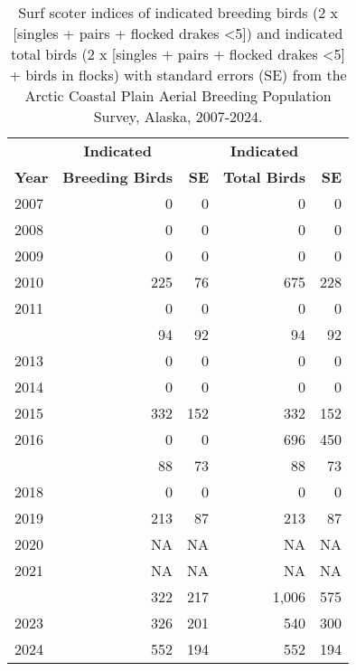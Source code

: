 \documentclass[
]{article}
\begin{document}
\begingroup\fontsize{10}{12}\selectfont

\begin{longtable}[t]{lrrrr}

\caption{\label{tbl-SUSC}Surf scoter indices of indicated breeding birds
(2 x {[}singles + pairs + flocked drakes \textless5{]}) and indicated
total birds (2 x {[}singles + pairs + flocked drakes \textless5{]} +
birds in flocks) with standard errors (SE) from the Arctic Coastal Plain
Aerial Breeding Population Survey, Alaska, 2007-2024.}

\tabularnewline

\\
\toprule
\multicolumn{1}{c}{\textbf{ }} & \multicolumn{1}{c}{\textbf{Indicated}} & \multicolumn{1}{c}{\textbf{ }} & \multicolumn{1}{c}{\textbf{Indicated}} & \multicolumn{1}{c}{\textbf{ }} \\
\cmidrule(l{3pt}r{3pt}){2-2} \cmidrule(l{3pt}r{3pt}){4-4}
\textbf{Year} & \textbf{Breeding Birds} & \textbf{SE} & \textbf{Total Birds} & \textbf{SE}\\
\midrule
2007 & 0 & 0 & 0 & 0\\
2008 & 0 & 0 & 0 & 0\\
2009 & 0 & 0 & 0 & 0\\
2010 & 225 & 76 & 675 & 228\\
2011 & 0 & 0 & 0 & 0\\
\addlinespace
2012 & 94 & 92 & 94 & 92\\
2013 & 0 & 0 & 0 & 0\\
2014 & 0 & 0 & 0 & 0\\
2015 & 332 & 152 & 332 & 152\\
2016 & 0 & 0 & 696 & 450\\
\addlinespace
2017 & 88 & 73 & 88 & 73\\
2018 & 0 & 0 & 0 & 0\\
2019 & 213 & 87 & 213 & 87\\
2020 & NA & NA & NA & NA\\
2021 & NA & NA & NA & NA\\
\addlinespace
2022 & 322 & 217 & 1,006 & 575\\
2023 & 326 & 201 & 540 & 300\\
2024 & 552 & 194 & 552 & 194\\
\bottomrule

\end{longtable}

\endgroup{}

\newpage{}
\end{document}
